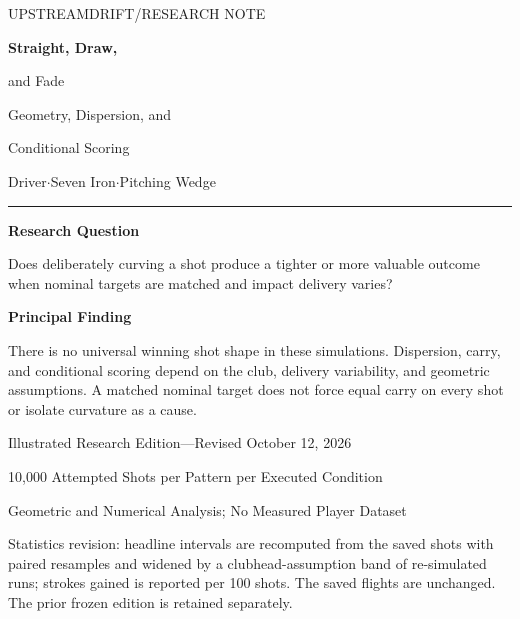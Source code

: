 \documentclass[11pt,letterpaper]{article}
\begin{document}
\hypersetup{pageanchor=false}
\begin{titlepage}
\thispagestyle{empty}
{\sffamily\large\color{ResearchTeal}UPSTREAMDRIFT\quad /\quad RESEARCH NOTE}\par
\vspace{1.15in}
{\Huge\bfseries\color{ResearchNavy}Straight, Draw,\par and Fade}\par
\vspace{0.3in}
{\LARGE Geometry, Dispersion, and\par Conditional Scoring}\par
\vspace{0.4in}
{\large Driver\quad $\cdot$\quad Seven Iron\quad $\cdot$\quad Pitching Wedge}\par
\vspace{0.5in}
\noindent\textcolor{ResearchTeal}{\rule{\textwidth}{1.2pt}}
\vspace{0.15in}
\textbf{Research Question}\par
Does deliberately curving a shot produce a tighter or more valuable outcome
when nominal targets are matched and impact delivery varies?\par
\vspace{0.18in}
\textbf{Principal Finding}\par
There is no universal winning shot shape in these simulations. Dispersion,
carry, and conditional scoring depend on the club, delivery variability, and
geometric assumptions. A matched nominal target does not force equal carry
on every shot or isolate curvature as a cause.
\vfill
{\small\color{ResearchGray}Illustrated Research Edition---Revised October 12, 2026\par
10,000 Attempted Shots per Pattern per Executed Condition\par
Geometric and Numerical Analysis; No Measured Player Dataset\par
\vspace{0.12in}
Statistics revision: headline intervals are recomputed from the saved shots
with \BootstrapResamples{} paired resamples and widened by a clubhead-assumption
band of \BandVariantRuns{} re-simulated runs; strokes gained is reported per
100 shots. The saved flights are unchanged. The prior frozen edition is
retained separately.}
\end{titlepage}
\hypersetup{pageanchor=true}
\end{document}
